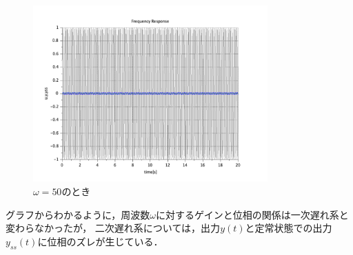\documentclass[a4paper,11pt]{jsarticle}
\begin{document}
    \begin{figure}[H]
      \centering
      \includegraphics[width=9cm]{picture/3-1-2-50.png}
      \caption{$\omega = 50$のとき}
      \label{3-1-2-50}
    \end{figure}
    グラフからわかるように，周波数$\omega$に対するゲインと位相の関係は一次遅れ系と変わらなかったが，
    二次遅れ系については，出力$y(t)$と定常状態での出力$y_{ss}(t)$に位相のズレが生じている．
  
\end{document}
